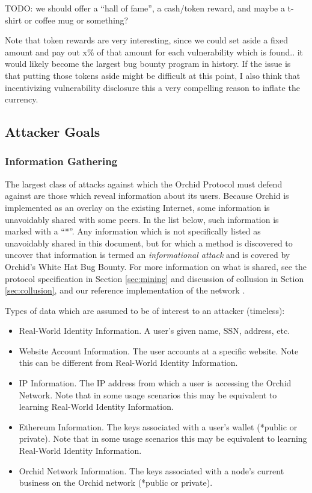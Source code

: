 \documentclass{article}
\newcommand{\mesh}{Orchid}
\begin{document}
TODO: we should offer a “hall of fame”, a cash/token reward, and maybe a t-shirt or coffee mug or something?

Note that token rewards are very interesting, since we could set aside a fixed amount and pay out x\% of that amount for each vulnerability which is found.. it would likely become the largest bug bounty program in history. If the issue is that putting those tokens aside might be difficult at this point, I also think that incentivizing vulnerability disclosure this a very compelling reason to inflate the currency.

\subsection{Attacker Goals}

\subsubsection{Information Gathering}

The largest class of attacks against which the \mesh{} Protocol must defend against are those which reveal information about its users. Because \mesh{} is implemented as an overlay on the existing Internet, some information is unavoidably shared with some peers. In the list below, such information is marked with a “*”. Any information which is not specifically listed as unavoidably shared in this document, but for which a method is discovered to uncover that information is termed an \emph{informational attack} and is covered by \mesh{}’s White Hat Bug Bounty. For more information on what is shared, see the protocol specification in Section \ref{sec:mining} and discussion of collusion in Sction \ref{sec:collusion}, and our reference implementation of the network \cite{oursoftware}.

Types of data which are assumed to be of interest to an attacker (timeless):

\begin{itemize}
    \item Real-World Identity Information. A user’s given name, SSN, address, etc.
    \item Website Account Information. The user accounts at a specific website. Note this can be different from Real-World Identity Information.
    \item IP Information. The IP address from which a user is accessing the \mesh{} Network. Note that in some usage scenarios this may be equivalent to learning Real-World Identity Information.
    \item Ethereum Information. The keys associated with a user’s wallet (*public or private). Note that in some usage scenarios this may be equivalent to learning Real-World Identity Information.
    \item \mesh{} Network Information. The keys associated with a node’s current business on the \mesh{} network (*public or private).
\end{itemize}
\end{document}
